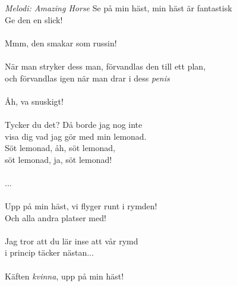 {\footnotesize\textit{Melodi: Amazing Horse}}
\vspace{10pt}
Se på min häst, min häst är fantastisk\\
Ge den en slick!\\
\\
Mmm, den smakar som russin!\\
\\
När man stryker dess man, förvandlas den till ett plan,\\
och förvandlas igen när man drar i dess {\it penis}\\
\\
Åh, va snuskigt!\\
\\
Tycker du det? Då borde jag nog inte\\
visa dig vad jag gör med min lemonad.\\
Söt lemonad, åh, söt lemonad,\\
söt lemonad, ja, söt lemonad!\\
\\
...\\
\\
Upp på min häst, vi flyger runt i rymden!\\
Och alla andra platser med!\\
\\
Jag tror att du lär inse att vår rymd\\
i princip täcker nästan...\\
\\
Käften {\it kvinna}, upp på min häst!
